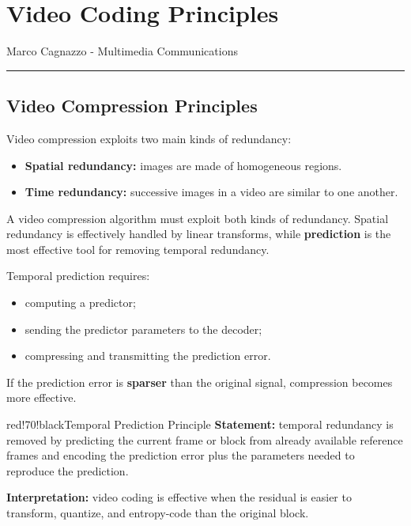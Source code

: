 \chapter{Video Coding Principles}

Marco Cagnazzo - Multimedia Communications

\bigskip\hrule\bigskip

\section{Video Compression Principles}

Video compression exploits two main kinds of redundancy:

\begin{itemize}
\item \textbf{Spatial redundancy:} images are made of homogeneous regions.
\item \textbf{Time redundancy:} successive images in a video are similar to one another.
\end{itemize}

A video compression algorithm must exploit both kinds of redundancy. Spatial redundancy is effectively handled by linear transforms, while \textbf{prediction} is the most effective tool for removing temporal redundancy.

Temporal prediction requires:

\begin{itemize}
\item computing a predictor;
\item sending the predictor parameters to the decoder;
\item compressing and transmitting the prediction error.
\end{itemize}

If the prediction error is \textbf{sparser} than the original signal, compression becomes more effective.

\begin{calloutbox}{red!70!black}{Temporal Prediction Principle}
\textbf{Statement:} temporal redundancy is removed by predicting the current frame or block from already available reference frames and encoding the prediction error plus the parameters needed to reproduce the prediction.

\textbf{Interpretation:} video coding is effective when the residual is easier to transform, quantize, and entropy-code than the original block.
\end{calloutbox}

